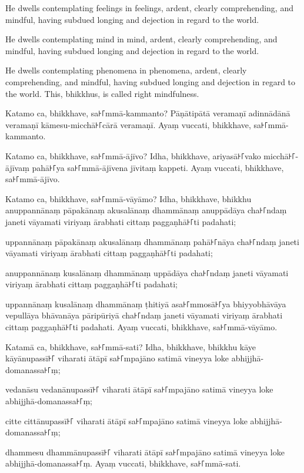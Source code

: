 He dwells contemplating feelings in feelings, ardent, clearly comprehending, and
mindful, having subdued longing and dejection in regard to the world.

He dwells contemplating mind in mind, ardent, clearly comprehending, and
mindful, having subdued longing and dejection in regard to the world.

He dwells contemplating phenomena in phenomena, ardent, clearly comprehending,
and mindful, having subdued longing and dejection in regard to the world. This,
bhikkhus, is called right mindfulness.

\paliPage

Katamo ca, bhikkhave, sa꜔꜒mmā-kammanto? Pāṇātipātā veramaṇī adinnādānā veramaṇī
kāmesu-micchā꜔꜒cārā veramaṇī. Ayaṃ vuccati, bhikkhave, sa꜔꜒mmā-kammanto.

Katamo ca, bhikkhave, sa꜔꜒mmā-ājīvo? Idha, bhikkhave, ariyasā꜔꜒vako micchā꜔꜒-ājīvaṃ
pahā꜔꜒ya sa꜔꜒mmā-ājīvena jīvitaṃ kappeti. Ayaṃ vuccati, bhikkhave, sa꜔꜒mmā-ājīvo.

Katamo ca, bhikkhave, sa꜔꜒mmā-vāyāmo? Idha, bhikkhave, bhikkhu
anuppannānaṃ pāpakānaṃ akusalānaṃ dhammānaṃ
anuppādāya cha꜔꜒ndaṃ janeti vāyamati viriyaṃ ārabhati cittaṃ paggaṇhā꜔꜒ti padahati;

uppannānaṃ pāpakānaṃ akusalānaṃ dhammānaṃ
pahā꜔꜒nāya cha꜔꜒ndaṃ janeti vāyamati viriyaṃ ārabhati cittaṃ paggaṇhā꜔꜒ti padahati;

anuppannānaṃ kusalānaṃ dhammānaṃ
uppādāya cha꜔꜒ndaṃ janeti vāyamati viriyaṃ ārabhati cittaṃ paggaṇhā꜔꜒ti padahati;

uppannānaṃ kusalānaṃ dhammānaṃ
ṭhitiyā asa꜔꜒mmosā꜔꜒ya bhiyyobhāvāya vepullāya
bhāvanāya pāripūriyā cha꜔꜒ndaṃ janeti vāyamati viriyaṃ ārabhati cittaṃ paggaṇhā꜔꜒ti
padahati. Ayaṃ vuccati, bhikkhave, sa꜔꜒mmā-vāyāmo.

Katamā ca, bhikkhave, sa꜔꜒mmā-sati? Idha, bhikkhave, bhikkhu kāye kāyānupassī꜔꜒
viharati ātāpī sa꜔꜒mpajāno satimā vineyya loke abhijjhā-domanassa꜔꜒ṃ;

vedanāsu vedanānupassī꜔꜒ viharati ātāpī sa꜔꜒mpajāno satimā vineyya loke
abhijjhā-domanassa꜔꜒ṃ;

\enlargethispage{\baselineskip}

citte cittānupassī꜔꜒ viharati ātāpī sa꜔꜒mpajāno satimā vineyya loke
abhijjhā-domanassa꜔꜒ṃ;

dhammesu dhammānupassī꜔꜒ viharati ātāpī sa꜔꜒mpajāno satimā vineyya loke
abhijjhā-domanassa꜔꜒ṃ. Ayaṃ vuccati, bhikkhave, sa꜔꜒mmā-sati.

\englishPage

